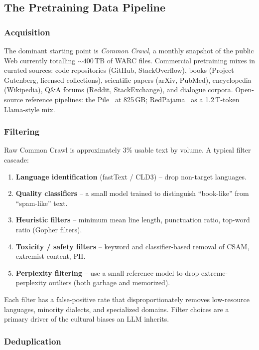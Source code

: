 \subsection{The Pretraining Data Pipeline}

\subsubsection{Acquisition}

The dominant starting point is \emph{Common Crawl}, a monthly
snapshot of the public Web currently totalling $\sim\!400$\,TB of
WARC files. Commercial pretraining mixes in curated sources: code
repositories (GitHub, StackOverflow), books (Project Gutenberg,
licensed collections), scientific papers (arXiv, PubMed),
encyclopedia (Wikipedia), Q\&A forums (Reddit, StackExchange), and
dialogue corpora. Open-source reference pipelines: the
Pile~\citep{gao2020pile} at 825\,GB; RedPajama~\citep{redpajama2023} as
a 1.2\,T-token Llama-style mix.

\subsubsection{Filtering}

Raw Common Crawl is approximately $3\%$ usable text by volume. A
typical filter cascade:
\begin{enumerate}
  \item \textbf{Language identification} (fastText / CLD3) -- drop
        non-target languages.
  \item \textbf{Quality classifiers} -- a small model trained to
        distinguish ``book-like'' from ``spam-like'' text.
  \item \textbf{Heuristic filters} -- minimum mean line length,
        punctuation ratio, top-word ratio (Gopher filters).
  \item \textbf{Toxicity / safety filters} -- keyword and
        classifier-based removal of CSAM, extremist content, PII.
  \item \textbf{Perplexity filtering} -- use a small reference model
        to drop extreme-perplexity outliers (both garbage and
        memorized).
\end{enumerate}
Each filter has a false-positive rate that disproportionately removes
low-resource languages, minority dialects, and specialized domains.
Filter choices are a primary driver of the cultural biases an LLM
inherits.

\subsubsection{Deduplication}

